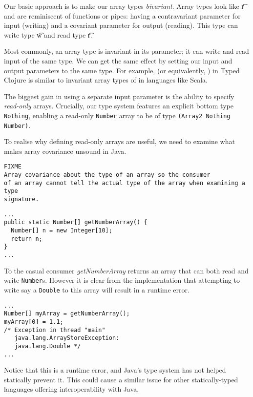 \documentclass[preprint,10pt]{sigplanconf}
\begin{document}
Our basic approach is to make our array types \emph{bivariant}. Array types
look like { {\t{r}}} and
are reminiscent of functions or pipes: having a contravariant parameter for input (writing)
and a covariant parameter for output (reading).
This type can write type {\t{w}} and read type {\t{r}}.

Most commonly, an array type is invariant in its parameter; it can
write and read input of the same type.
We can get the same effect by setting our input and output
parameters to the same type. For example, {\ArrayTwo {\Number} {\Number}}
(or equivalently, {\Array {\Number}})
in Typed Clojure is similar to invariant array types of \Number in languages like Scala.

The biggest gain in using a separate input parameter is the ability
to specify \emph{read-only} arrays. Crucially, our type system features an
explicit bottom type \lstinline|Nothing|, enabling a read-only \lstinline|Number| array
to be of type \lstinline|(Array2 Nothing Number)|.

To realise why defining read-only arrays are useful, we need to examine
what makes array covariance unsound in Java.
\begin{verbatim}
FIXME
Array covariance about the type of an array so the consumer
of an array cannot tell the actual type of the array when examining a type
signature.
\end{verbatim}

\begin{lstlisting}
...
public static Number[] getNumberArray() {
  Number[] n = new Integer[10];
  return n;
}
...
\end{lstlisting}

To the casual consumer \emph{getNumberArray} returns an array that can both
read and write \lstinline|Number|s. However it is clear from the implementation
that attempting to write say a \lstinline|Double| to this array will result
in a runtime error.

\begin{verbatim}
...
Number[] myArray = getNumberArray();
myArray[0] = 1.1;
/* Exception in thread "main" 
   java.lang.ArrayStoreException: 
   java.lang.Double */
...
\end{verbatim}

Notice that this is a runtime error, and Java's type system has not helped
statically prevent it.
This could cause a similar issue for other statically-typed languages offering
interoperability with Java. 
\end{document}
